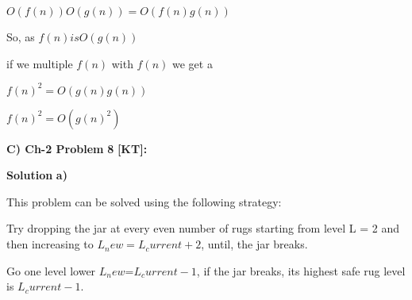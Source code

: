 \documentclass[letterpaper,portrait,12pt]{article}
\begin{document}
\begin{flushleft}
$O(f(n)) O(g(n)) = O(f(n)g(n))$
\end{flushleft}


\begin{flushleft}

\end{flushleft}


\begin{flushleft}
So, as $f(n) is O(g(n))
$
\end{flushleft}


\begin{flushleft}
if we multiple $f(n) 
$ with $f(n) 
$ we get a 
\end{flushleft}


\begin{flushleft}
$f(n) ^2 = O(g(n)g(n))
$
\end{flushleft}


\begin{flushleft}
$f(n) ^2 = O(g(n)^2)
$
\end{flushleft}


\begin{flushleft}

\end{flushleft}


\begin{flushleft}
\textbf{C}\textbf{) Ch-2 Problem }\textbf{8}\textbf{ [KT]:}
\end{flushleft}


\begin{flushleft}

\end{flushleft}


\begin{flushleft}
\textbf{Sol}\textbf{ution }\textbf{a}\textbf{)}
\end{flushleft}


\begin{flushleft}
This problem can be solved using the following strategy:
\end{flushleft}


\begin{flushleft}
Try dropping the jar at every even number of rugs starting from level L = 2 and then increasing to $L_new=L_current+2$, until, the jar breaks.
\end{flushleft}


\begin{flushleft}
Go one level lower $L_new$=$L_current-1$, if the jar breaks, its highest safe rug level is $L_current-1.$
\end{flushleft}
\end{document}
